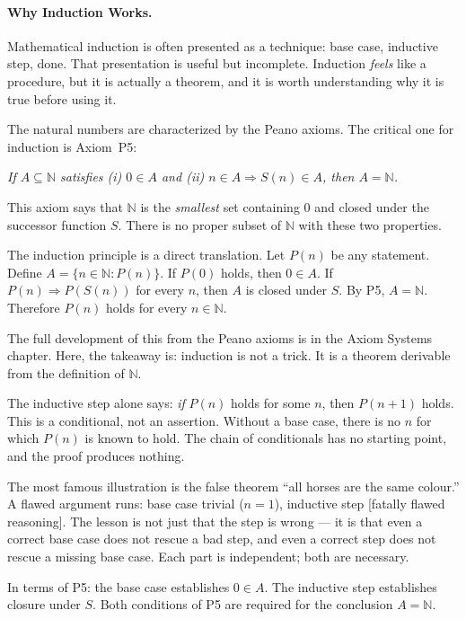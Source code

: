 \paragraph{Why Induction Works.}

Mathematical induction is often presented as a technique: base case,
inductive step, done. That presentation is useful but incomplete.
Induction \emph{feels} like a procedure, but it is actually a theorem,
and it is worth understanding why it is true before using it.

\begin{remark}
The natural numbers are characterized by the Peano axioms.
The critical one for induction is Axiom~P5:

\medskip
\noindent\textit{If $A \subseteq \mathbb{N}$ satisfies (i) $0 \in A$ and
(ii) $n \in A \Rightarrow S(n) \in A$, then $A = \mathbb{N}$.}

\medskip
\noindent This axiom says that $\mathbb{N}$ is the \emph{smallest}
set containing $0$ and closed under the successor function $S$.
There is no proper subset of $\mathbb{N}$ with these two properties.

The induction principle is a direct translation. Let $P(n)$ be any
statement. Define $A = \{n \in \mathbb{N} : P(n)\}$. If $P(0)$ holds,
then $0 \in A$. If $P(n) \Rightarrow P(S(n))$ for every $n$, then
$A$ is closed under $S$. By P5, $A = \mathbb{N}$.
Therefore $P(n)$ holds for every $n \in \mathbb{N}$.

The full development of this from the Peano axioms is in the
Axiom Systems chapter. Here, the takeaway is: induction is not
a trick. It is a theorem derivable from the definition of $\mathbb{N}$.
\end{remark}

\begin{remark}
The inductive step alone says: \emph{if} $P(n)$ holds for some $n$,
then $P(n+1)$ holds. This is a conditional, not an assertion.
Without a base case, there is no $n$ for which $P(n)$ is known to hold.
The chain of conditionals has no starting point, and the proof produces
nothing.

The most famous illustration is the false theorem ``all horses are the
same colour.'' A flawed argument runs: base case trivial ($n=1$),
inductive step [fatally flawed reasoning]. The lesson is not just that
the step is wrong --- it is that even a correct base case does not rescue
a bad step, and even a correct step does not rescue a missing base case.
Each part is independent; both are necessary.

In terms of P5: the base case establishes $0 \in A$. The inductive step
establishes closure under $S$. Both conditions of P5 are required for
the conclusion $A = \mathbb{N}$.
\end{remark}

